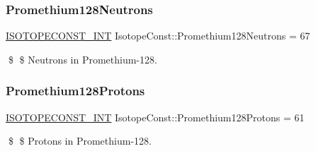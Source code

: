\subsubsection{\texorpdfstring{Promethium128\+Neutrons}{Promethium128Neutrons}}
{\footnotesize\ttfamily \mbox{\hyperlink{group___isotope_const-_macros_ga5f18360b3e99483a35c32d789e62621c}{I\+S\+O\+T\+O\+P\+E\+C\+O\+N\+S\+T\+\_\+\+I\+NT}} Isotope\+Const\+::\+Promethium128\+Neutrons = 67}

\$ \$ Neutrons in Promethium-\/128. \mbox{\label{group___isotope_const-_promethium-_pm128_gaee331929fa5933dd52dfcfe98c6f9fd0}} 
\subsubsection{\texorpdfstring{Promethium128\+Protons}{Promethium128Protons}}
{\footnotesize\ttfamily \mbox{\hyperlink{group___isotope_const-_macros_ga5f18360b3e99483a35c32d789e62621c}{I\+S\+O\+T\+O\+P\+E\+C\+O\+N\+S\+T\+\_\+\+I\+NT}} Isotope\+Const\+::\+Promethium128\+Protons = 61}

\$ \$ Protons in Promethium-\/128. 